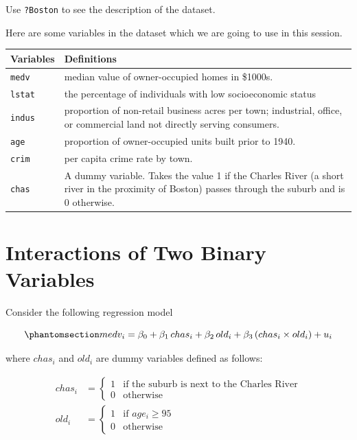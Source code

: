 \documentclass[
  12pt,
  letterpaper,
]{scrbook}
\theoremstyle{plain}
\theoremstyle{definition}
\theoremstyle{remark}
\begin{document}
Use \texttt{?Boston} to see the description of the dataset.

Here are some variables in the dataset which we are going to use in this
session.

\begin{longtable}[]{@{}
  >{\raggedright\arraybackslash}p{}
  >{\raggedright\arraybackslash}p{}@{}}
\toprule\noalign{}
\begin{minipage}[b]{\linewidth}\raggedright
Variables
\end{minipage} & \begin{minipage}[b]{\linewidth}\raggedright
Definitions
\end{minipage} \\
\midrule\noalign{}
\endhead
\bottomrule\noalign{}
\endlastfoot
\texttt{medv} & median value of owner-occupied homes in \$1000s. \\
\texttt{lstat} & the percentage of individuals with low socioeconomic
status \\
\texttt{indus} & proportion of non-retail business acres per town;
industrial, office, or commercial land not directly serving
consumers. \\
\texttt{age} & proportion of owner-occupied units built prior to
1940. \\
\texttt{crim} & per capita crime rate by town. \\
\texttt{chas} & A dummy variable. Takes the value 1 if the Charles River
(a short river in the proximity of Boston) passes through the suburb and
is 0 otherwise. \\
\end{longtable}

\section{Interactions of Two Binary
Variables}\label{interactions-of-two-binary-variables}

Consider the following regression model

\begin{equation}\phantomsection\label{eq-binary-interaction}{
medv_i = \beta_0 + \beta_1\, chas_i + \beta_2\, old_i + \beta_3\, (chas_i \times old_i) + u_i
}\end{equation}

where \(chas_i\) and \(old_i\) are dummy variables defined as follows:

\[
\begin{aligned}
chas_i &= \begin{cases}
1 & \text{if the suburb is next to the Charles River} \\
0 & \text{otherwise}
\end{cases} \\
old_i &= \begin{cases}
1 & \text{if } age_i \ge 95 \\
0 & \text{otherwise}
\end{cases}
\end{aligned}
\]
\end{document}
